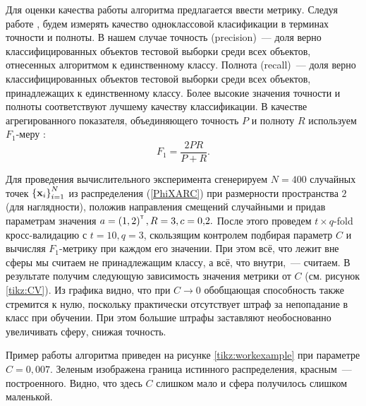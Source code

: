 Для оценки качества работы алгоритма предлагается ввести метрику.
Следуя работе  \cite{Romanenko2012}, будем измерять качество одноклассовой класификации в терминах точности и полноты.
В нашем случае точность (precision)~--- доля верно классифицированных объектов тестовой выборки среди всех объектов, отнесенных алгоритмом к единственному классу.
Полнота (recall)~--- доля верно классифицированных объектов тестовой выборки среди всех объектов, принадлежащих к единственному классу.
Более высокие значения точности и полноты соответствуют лучшему качеству классификации.
В качестве агрегированного показателя, объединяющего точность $P$ и полноту $R$ используем $F_1$-меру \cite{Rijsbergen1979}:
$$F_1 = \frac{2PR}{P+R}.$$

Для проведения вычислительного эксперимента сгенерируем $N=400$ случайных точек $\left\{\boldsymbol{\mathbf{x}}_i\right\}_{i=1}^N$ из распределения (\ref{PhiXARC}) при размерности пространства $2$ (для наглядности), положив направления смещений случайными и придав параметрам значения $a = \left(1,2\right)^{\text{\tiny\sffamily\upshape\mdseries T}}, R = 3, c = 0{,}2.$
После этого проведем $t{\times}q$-fold кросс-валидацию с $t = 10, q = 3$, скользящим контролем подбирая параметр $C$ и вычисляя $F_1$-метрику при каждом его значении. При этом всё, что лежит вне сферы мы считаем не принадлежащим классу, а всё, что внутри,~--- считаем.
В результате получим следующую зависимость значения метрики от $C$ (см. рисунок \ref{tikz:CV}).
Из графика видно, что при $C\to 0$ обобщающая способность также стремится к нулю, поскольку практически отсутствует штраф за непопадание в класс при обучении.
При этом большие штрафы заставляют необоснованно увеличивать сферу, снижая точность.

Пример работы алгоритма приведен на рисунке \ref{tikz:workexample} при параметре $C = 0{,}007.$
Зеленым изображена граница истинного распределения, красным~--- построенного.
Видно, что здесь $C$ слишком мало и сфера получилось слишком маленькой.


